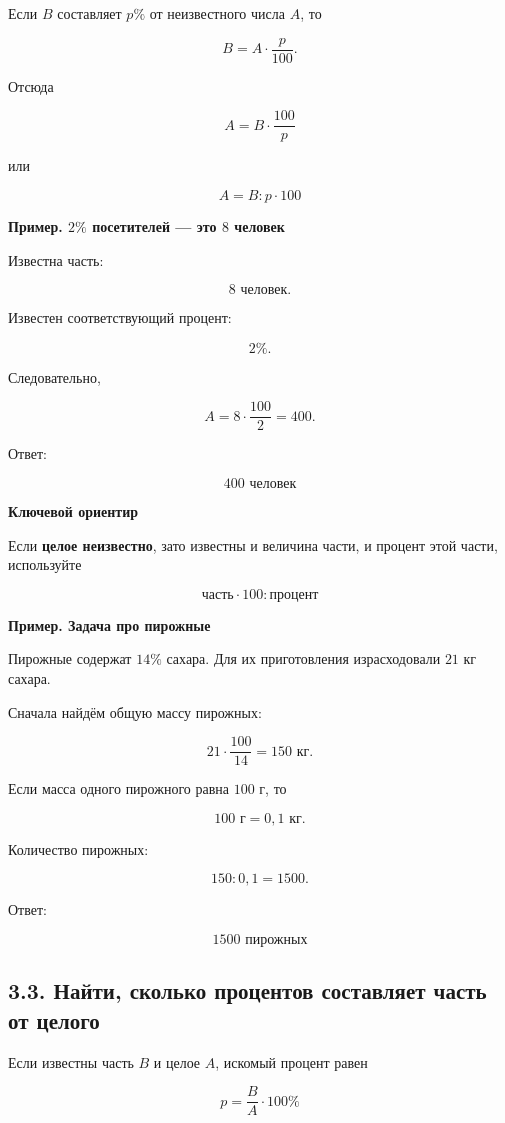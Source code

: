 \documentclass[a4paper,12pt]{article}
\newcommand{\important}[1]{%
    \par\medskip
    {\color{darkaccent}\textbf{#1}}
    \par\smallskip
}
\newcommand{\exampletitle}[1]{%
    \par\medskip
    {\color{accent}\textbf{Пример. #1}}
    \par\smallskip
}
\begin{document}
Если \(B\) составляет \(p\%\) от неизвестного числа \(A\), то

\[
B=A\cdot\frac{p}{100}.
\]

Отсюда

\[
\boxed{
A=B\cdot\frac{100}{p}
}
\]

или

\[
\boxed{
A=B:p\cdot100
}
\]

\exampletitle{\(2\%\) посетителей --- это \(8\) человек}

Известна часть:

\[
8\text{ человек}.
\]

Известен соответствующий процент:

\[
2\%.
\]

Следовательно,

\[
A
=
8\cdot\frac{100}{2}
=
400.
\]

Ответ:

\[
\boxed{400\text{ человек}}
\]

\important{Ключевой ориентир}

Если \textbf{целое неизвестно}, зато известны и величина части, и процент этой части,
используйте

\[
\boxed{\text{часть}\cdot100:\text{процент}}
\]

\exampletitle{Задача про пирожные}

Пирожные содержат \(14\%\) сахара. Для их приготовления израсходовали
\(21\) кг сахара.

Сначала найдём общую массу пирожных:

\[
21\cdot\frac{100}{14}
=
150\text{ кг}.
\]

Если масса одного пирожного равна \(100\) г, то

\[
100\text{ г}=0{,}1\text{ кг}.
\]

Количество пирожных:

\[
150:0{,}1=1500.
\]

Ответ:

\[
\boxed{1500\text{ пирожных}}
\]

\subsection*{\color{accent}3.3. Найти, сколько процентов составляет часть от целого}

Если известны часть \(B\) и целое \(A\), искомый процент равен

\[
\boxed{
p=\frac{B}{A}\cdot100\%
}
\]
\end{document}
